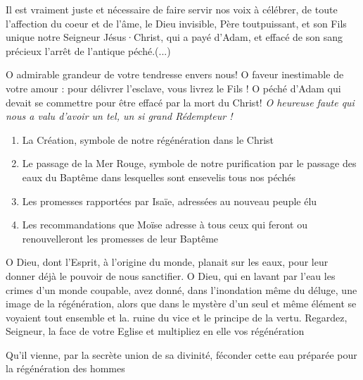\documentclass[%
fontsize=12%
,a5paper%
,DIV=15%
]{scrartcl}
\begin{document}

Il est vraiment juste et nécessaire
de faire servir nos voix à célébrer,
de toute l'affection du coeur et de
l'âme, le Dieu invisible, Père toutpuissant,
et son Fils unique notre Seigneur Jésus·Christ, qui a payé d'Adam, et effacé de son sang précieux l'arrêt de l'antique péché.(...)

O admirable grandeur de votre tendresse envers nous! O faveur inestimable de votre
amour : pour délivrer l'esclave, vous livrez le Fils !
O péché d'Adam qui devait se commettre pour être effacé par la mort du Christ!
\emph{O heureuse faute qui nous a valu d'avoir un tel, un si grand Rédempteur !}



\begin{enumerate}
\item{La Création, symbole de notre régénération dans le Christ}
\item{Le passage de la Mer Rouge, symbole de notre purification par le passage des eaux du Baptême dans lesquelles sont ensevelis tous nos péchés}
\item{Les promesses rapportées par Isaïe, adressées au nouveau peuple élu}
\item{Les recommandations que Moïse adresse à tous ceux qui feront ou renouvelleront les promesses de leur Baptême}
\end{enumerate}




O Dieu, dont l'Esprit, à l'origine du
monde, planait sur les eaux, pour
leur donner déjà le pouvoir de nous
sanctifier. O Dieu, qui en lavant
par l'eau les crimes d'un monde coupable, avez donné, dans l'inondation
même du déluge, une image de la
régénération, alors que dans le mystère d'un seul et même élément se voyaient tout ensemble et la. ruine
du vice et le principe de la vertu.
Regardez, Seigneur, la face de votre
Eglise et multipliez en elle vos régénération

Qu'il vienne, par la secrète union
de sa divinité, féconder cette
eau préparée pour la régénération des hommes
\end{document}
